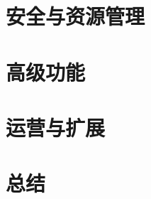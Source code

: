 \documentclass[12pt, a4paper, openany]{book}
\begin{document}
\part{安全与资源管理}



\part{高级功能}




\part{运营与扩展}





\part{总结}

\end{document}
